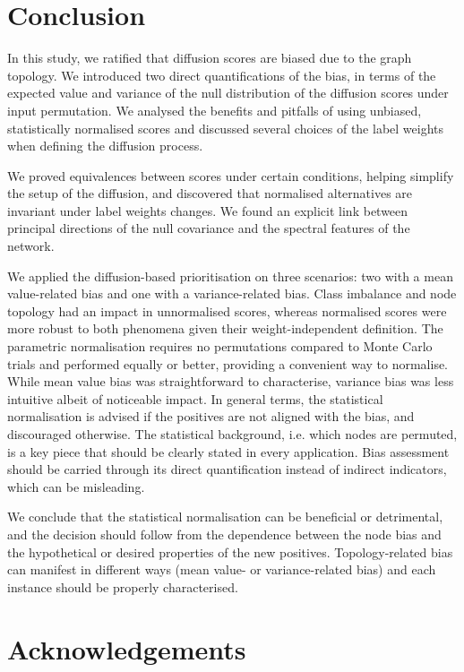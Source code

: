 \documentclass[final]{bioinfo}
\begin{document}
\section*{Conclusion}

In this study, we ratified that diffusion scores are biased due to the graph topology. 
We introduced two direct quantifications of the bias, in terms of the expected value and variance of the null distribution of the diffusion scores under input permutation.
We analysed the benefits and pitfalls of using unbiased, statistically normalised scores and discussed several choices of the label weights when defining the diffusion process. 

We proved equivalences between scores under certain conditions, helping simplify the setup of the diffusion, and discovered that normalised alternatives are invariant under label weights changes. 
We found an explicit link between principal directions of the null covariance and the spectral features of the network.

We applied the diffusion-based prioritisation on three scenarios: two with a mean value-related bias and one with a variance-related bias. 
Class imbalance and node topology had an impact in unnormalised scores, whereas
normalised scores were more robust to both phenomena given their weight-independent definition. 
The parametric normalisation requires no permutations compared to Monte Carlo trials and performed equally or better, providing a convenient way to normalise.
While mean value bias was straightforward to characterise, variance bias was less intuitive albeit of noticeable impact. 
In general terms, the statistical normalisation is advised if the positives are not aligned with the bias, and discouraged otherwise. 
The statistical background, i.e. which nodes are permuted, is a key piece that should be clearly stated in every application.
Bias assessment should be carried through its direct quantification instead of indirect indicators, which can be misleading.
 
We conclude that the statistical normalisation can be beneficial or detrimental, and the decision should follow from the dependence between the node bias and the hypothetical or desired properties of the new positives. 
Topology-related bias can manifest in different ways (mean value- or variance-related bias) and each instance should be properly characterised.


\section*{Acknowledgements}
\end{document}
